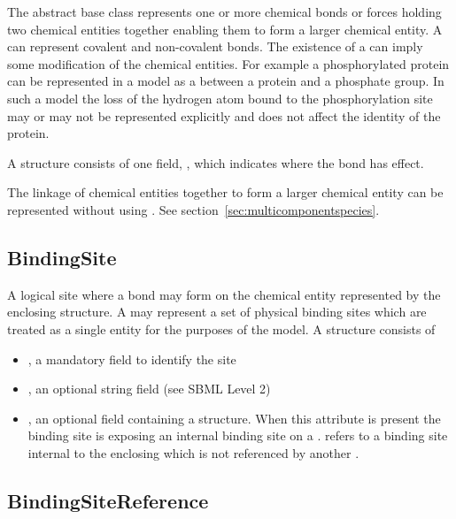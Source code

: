 \documentclass{cekarticle}
\begin{document}
The abstract base class  represents one or more chemical bonds or forces holding two chemical
entities together enabling them to form a larger chemical entity.  A  can represent
covalent and non-covalent bonds.  The existence of a  can imply some
modification of the chemical entities.  For example a phosphorylated protein can be represented
in a model as a  between a protein and a phosphate group.  In such a model
the loss of the hydrogen atom bound to the phosphorylation site may or may not be represented
explicitly and does not affect the identity of the protein.  

A  structure consists of one  field,
, which indicates where the bond has effect.

The linkage of chemical entities together to form a larger chemical entity can be 
represented without using .  See section~\ref{sec:multicomponentspecies}.

\subsection{BindingSite}

A logical site where a bond may form on the chemical entity represented by the
enclosing  structure.  A  may represent a set of
physical binding sites which are treated as a single entity for the purposes of the model.  
A  structure consists of

\begin{itemize}

\item {}, a mandatory  field to identify the site

\item {}, an optional string field (see SBML Level 2)

\item {}, an optional field containing a
 structure.  When this attribute is present the binding site is
exposing an internal binding site on a .
 refers to a binding site internal to the enclosing
 which is not referenced by another .

\end{itemize}

\subsection{BindingSiteReference}
\end{document}
